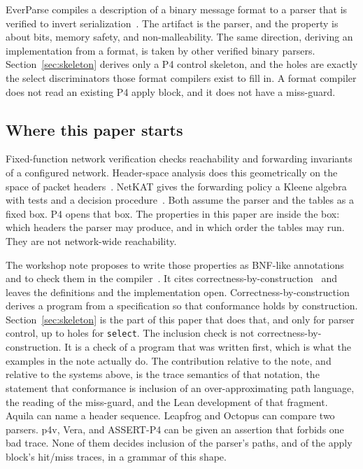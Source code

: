 \documentclass[a4paper,UKenglish,cleveref,autoref]{lipics-v2021}
\begin{document}
EverParse compiles a description of a binary message format to a parser that is verified to invert serialization~\cite{everparse}.
The artifact is the parser, and the property is about bits, memory safety, and non-malleability.
The same direction, deriving an implementation from a format, is taken by other verified binary parsers.
Section~\ref{sec:skeleton} derives only a P4 control skeleton, and the holes are exactly the select discriminators those format compilers exist to fill in.
A format compiler does not read an existing P4 apply block, and it does not have a miss-guard.

\subsection{Where this paper starts}

Fixed-function network verification checks reachability and forwarding invariants of a configured network.
Header-space analysis does this geometrically on the space of packet headers~\cite{kazemian2012hsa}.
NetKAT gives the forwarding policy a Kleene algebra with tests and a decision procedure~\cite{netkat}.
Both assume the parser and the tables as a fixed box.
P4 opens that box.
The properties in this paper are inside the box: which headers the parser may produce, and in which order the tables may run.
They are not network-wide reachability.

The workshop note proposes to write those properties as BNF-like annotations and to check them in the compiler~\cite{yuan2025fmano}.
It cites correctness-by-construction~\cite{dijkstra1976,morgan1994,kourie2012} and leaves the definitions and the implementation open.
Correctness-by-construction derives a program from a specification so that conformance holds by construction.
Section~\ref{sec:skeleton} is the part of this paper that does that, and only for parser control, up to holes for \texttt{select}.
The inclusion check is not correctness-by-construction.
It is a check of a program that was written first, which is what the examples in the note actually do.
The contribution relative to the note, and relative to the systems above, is the trace semantics of that notation, the statement that conformance is inclusion of an over-approximating path language, the reading of the miss-guard, and the Lean development of that fragment.
Aquila can name a header sequence.
Leapfrog and Octopus can compare two parsers.
p4v, Vera, and ASSERT-P4 can be given an assertion that forbids one bad trace.
None of them decides inclusion of the parser's paths, and of the apply block's hit/miss traces, in a grammar of this shape.
\end{document}
